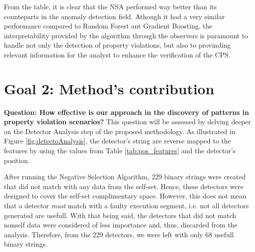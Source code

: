 
From the table, it is clear that the NSA performed way better than its counteparts in the anomaly detection field. Athough it had a very similar performance compared to Random Forest ant Gradient Boosting, the interpretability provided by the algorithm through the observers is paramount to handle not only the detection of property violations, but also to provinding relevant information for the analyst to enhance the verification of the CPS.

\section{Goal 2: Method's contribution}
\textbf{Question: How effective is our approach in the discovery of patterns in property violation scenarios?} This question will be assessed by delving deeper on the Detector Analysis step of the proposed methodology. As illustrated in Figure \ref{fig:detectoAnalysis}, the detector's string are reverse mapped to the features by using the values from Table \ref{tab:pos_features} and the detector's position. 

After running the Negative Selection Algorithm, 229 binary strings were created that did not match with any data from the self-set. Hence, these detectors were designed to cover the self-set complimentary space. However, this does not mean that a detector \textit{must} match with a faulty execution segment, i.e. not all detectors generated are usefull. With that being said, the detectors that did not match nonself data were considered of less importance and, thus, discarded from the analysis. Therefore, from the 229 detectors, we were left with only 68 usefull binary strings. 

